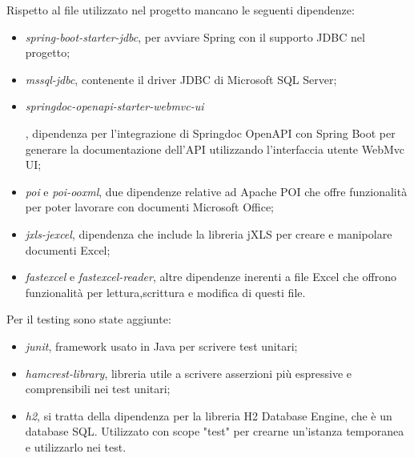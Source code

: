 Rispetto al file utilizzato nel progetto mancano le seguenti dipendenze:
\begin{itemize}
\item \textit{spring-boot-starter-jdbc}, per avviare Spring con il supporto JDBC nel progetto;
\item \textit{mssql-jdbc}, contenente il driver JDBC di Microsoft SQL Server;
\item \hypertarget{doc-api}{\textit{springdoc-openapi-starter-webmvc-ui}}, dipendenza per l'integrazione di Springdoc OpenAPI con Spring Boot per generare la documentazione dell'API utilizzando l'interfaccia utente WebMvc UI;
\item \textit{poi} e \textit{poi-ooxml}, due dipendenze relative ad Apache POI che offre funzionalità per poter lavorare con documenti Microsoft Office;
\item \textit{jxls-jexcel}, dipendenza che include la libreria jXLS per creare e manipolare documenti Excel;
\item \textit{fastexcel} e \textit{fastexcel-reader}, altre dipendenze inerenti a file Excel che offrono funzionalità per lettura,scrittura e modifica di questi file.
\end{itemize}
Per il testing sono state aggiunte:
\begin{itemize}
\item \textit{junit}, framework usato in Java per scrivere test unitari;
\item \textit{hamcrest-library}, libreria utile a scrivere asserzioni più espressive e comprensibili nei test unitari;
\item \textit{h2}, si tratta della dipendenza per la libreria H2 Database Engine, che è un database SQL. Utilizzato con scope "test" per crearne un'istanza temporanea e utilizzarlo nei test.
\end{itemize}

%
%
%

